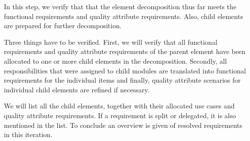 \npar In this step, we verify that that the element decomposition thus far meets
the functional requirements and quality attribute requirements. Also, child
elements are prepared for further decomposition.

\npar Three things have to be verified. First, we will verify that all
functional requirements and quality attribute requirements of the parent element
have been allocated to one or more child elements in the decomposition.
Secondly, all responsibilities that were assigned to child modules are
translated into functional requirements for the individual items and finally,
quality attribute scenarios for individual child elements are refined if
necessary.

\npar We will list all the child elements, together with their allocated use
cases and quality attribute requirements. If a requirement is split or
delegated, it is also mentioned in the list. To conclude an overview is given of
resolved requirements in this iteration.

